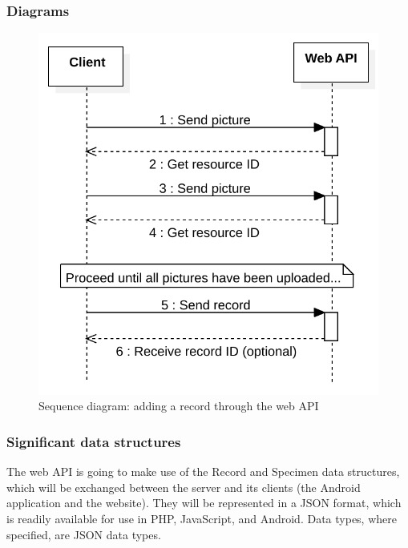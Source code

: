 \subsubsection{Diagrams}
\begin{figure}
\centering
\includegraphics[scale=0.75]{server/SequenceDiagram-AddRecord.svg}
\caption{Sequence diagram: adding a record through the web API}
\label{fig:addRecordSequenceDiagram}
\end{figure}



\subsubsection{Significant data structures}

The web API is going to make use of the Record and Specimen data structures,
which will be exchanged between the server and its clients (the Android
application and the website). They will be represented in a JSON format, which 
is readily available for use in PHP, JavaScript, and Android. Data types, where
specified, are JSON data types.

